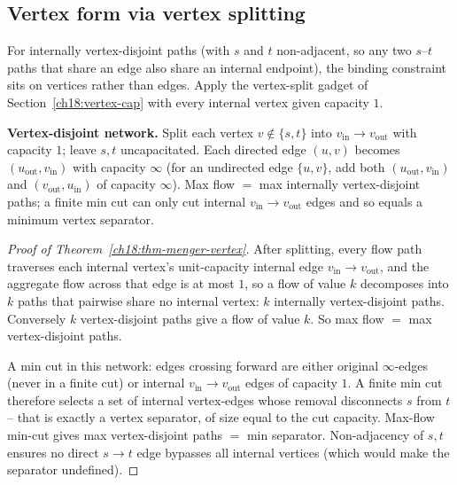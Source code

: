 \subsection{Vertex form via vertex splitting}

For internally vertex-disjoint paths (with $s$ and $t$ non-adjacent, so any two $s$--$t$ paths that share an edge also share an internal endpoint), the binding constraint sits on vertices rather than edges. Apply the vertex-split gadget of Section~\ref{ch18:vertex-cap} with every internal vertex given capacity $1$.

\begin{focusbox}
\textbf{Vertex-disjoint network.} Split each vertex $v\notin\{s,t\}$ into $v_{\text{in}}\to v_{\text{out}}$ with capacity $1$; leave $s,t$ uncapacitated. Each directed edge $(u,v)$ becomes $(u_{\text{out}}, v_{\text{in}})$ with capacity $\infty$ (for an undirected edge $\{u,v\}$, add both $(u_{\text{out}}, v_{\text{in}})$ and $(v_{\text{out}}, u_{\text{in}})$ of capacity $\infty$). Max flow $=$ max internally vertex-disjoint paths; a finite min cut can only cut internal $v_{\text{in}}\to v_{\text{out}}$ edges and so equals a minimum vertex separator.
\end{focusbox}

\begin{proof}[Proof of Theorem~\ref{ch18:thm-menger-vertex}]
After splitting, every flow path traverses each internal vertex's unit-capacity internal edge $v_{\text{in}}\to v_{\text{out}}$, and the aggregate flow across that edge is at most $1$, so a flow of value $k$ decomposes into $k$ paths that pairwise share no internal vertex: $k$ internally vertex-disjoint paths. Conversely $k$ vertex-disjoint paths give a flow of value $k$. So max flow $=$ max vertex-disjoint paths.

A min cut in this network: edges crossing forward are either original $\infty$-edges (never in a finite cut) or internal $v_{\text{in}}\to v_{\text{out}}$ edges of capacity $1$. A finite min cut therefore selects a set of internal vertex-edges whose removal disconnects $s$ from $t$ -- that is exactly a vertex separator, of size equal to the cut capacity. Max-flow min-cut gives max vertex-disjoint paths $=$ min separator. Non-adjacency of $s,t$ ensures no direct $s\to t$ edge bypasses all internal vertices (which would make the separator undefined).
\end{proof}


